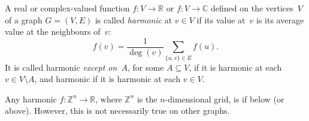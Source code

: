 \documentclass[12pt]{article}
\newcommand{\<}{\langle}
\renewcommand{\>}{\rangle}
\begin{document}
A real or complex-valued function $f:V\to\mathbb{R}$ or $f:V\to\mathbb{C}$ defined on the vertices~$V$ of a graph $G=(V,E)$ is called \emph{harmonic} at $v\in V$ if its value at~$v$ is its average value at the neighbours of~$v$:
$$f(v) = \frac{1}{\operatorname{deg}(v)} \sum_{\{u,v\}\in E} f(u).$$
It is called harmonic \emph{except on~$A$}, for some $A\subseteq V$, if it is harmonic at each $v\in V\setminus A$, and harmonic if it is harmonic at each $v\in V$.

Any harmonic $f:\mathbb{Z}^n\to\mathbb{R}$, where $\mathbb{Z}^n$ is the $n$-dimensional grid, is  if  below (or above).  However, this is not necessarily true on other graphs.
\end{document}
